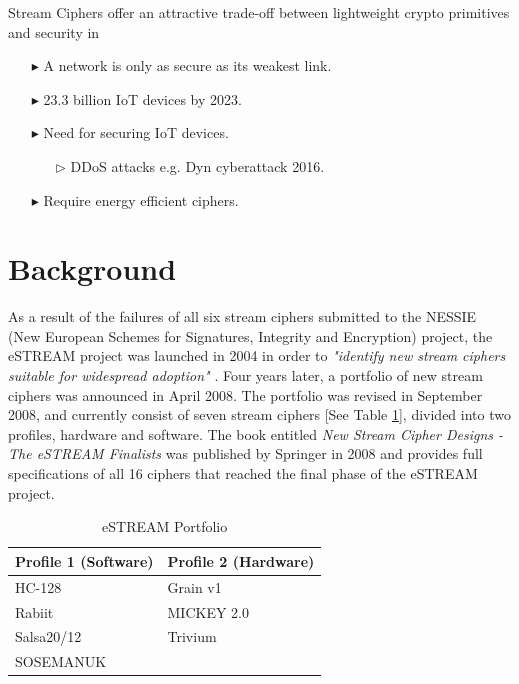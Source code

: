 \documentclass[conference]{IEEEtran}
\begin{document}
Stream Ciphers offer an attractive trade-off between lightweight crypto primitives and security in 


\begin{itemize}
\item[$\blacktriangleright$] A network is only as secure as its weakest link.
\item[$\blacktriangleright$] 23.3 billion IoT devices by 2023.
\item[$\blacktriangleright$] Need for securing IoT devices.
\begin{itemize}[itemsep=0.25cm]
\item[$\triangleright$] DDoS attacks e.g. Dyn cyberattack 2016.
\end{itemize}
\item[$\blacktriangleright$] Require energy efficient ciphers.
\end{itemize}

\section{Background}

As a result of the failures of all six stream ciphers submitted to the NESSIE (New European Schemes for Signatures, Integrity and Encryption) project, the eSTREAM project was launched in 2004 in order to \textit{"identify new stream ciphers suitable for widespread adoption"} \cite{call}. Four years later, a portfolio of new stream ciphers was announced in April 2008. The portfolio was revised in September 2008, and currently consist of seven stream ciphers [See Table \ref{tab:portfolio}], divided into two profiles, hardware and software. The book entitled \textit{New Stream Cipher Designs - The eSTREAM Finalists} \cite{book} was published by Springer in 2008 and provides full specifications of all 16 ciphers that reached the final phase of the eSTREAM project.
\begin{table}[H]
\centering
\begin{tabular}{|l|l|}\hline
Profile 1 (Software) & Profile 2 (Hardware)\\\hline
HC-128 & Grain v1\\
Rabiit & MICKEY 2.0\\
Salsa20/12 & Trivium\\
SOSEMANUK & \\\hline
\end{tabular}
\caption{eSTREAM Portfolio}
\label{tab:portfolio}
\end{table}
\end{document}
